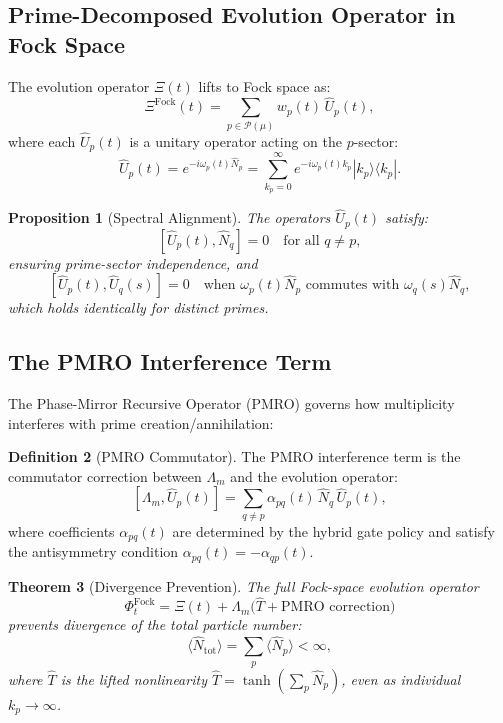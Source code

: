 \documentclass[11pt,a4paper]{article}
\theoremstyle{plain}
\newtheorem{theorem}{Theorem}[section]
\newtheorem{proposition}[theorem]{Proposition}
\theoremstyle{definition}
\newtheorem{definition}[theorem]{Definition}
\theoremstyle{remark}
\begin{document}
\subsection{Prime-Decomposed Evolution Operator in Fock Space}

The evolution operator \(\Xi(t)\) lifts to Fock space as:
\[
\Xi^{\text{Fock}}(t) = \sum_{p \in \mathcal{P}(\mu)} w_p(t) \, \hat{U}_p(t),
\]
where each \(\hat{U}_p(t)\) is a unitary operator acting on the \(p\)-sector:
\[
\hat{U}_p(t) = e^{-i \omega_p(t) \hat{N}_p} = \sum_{k_p=0}^\infty e^{-i \omega_p(t) k_p} |k_p\rangle\langle k_p|.
\]

\begin{proposition}[Spectral Alignment]\label{prop:spectral}
The operators \(\hat{U}_p(t)\) satisfy:
\[
[\hat{U}_p(t), \hat{N}_q] = 0 \quad \text{for all } q \neq p,
\]
ensuring prime-sector independence, and
\[
[\hat{U}_p(t), \hat{U}_q(s)] = 0 \quad \text{when } \omega_p(t) \hat{N}_p \text{ commutes with } \omega_q(s) \hat{N}_q,
\]
which holds identically for distinct primes.
\end{proposition}

\subsection{The PMRO Interference Term}

The Phase-Mirror Recursive Operator (PMRO) governs how multiplicity interferes with prime creation/annihilation:

\begin{definition}[PMRO Commutator]
The PMRO interference term is the commutator correction between \(\Lambda_m\) and the evolution operator:
\[
[\Lambda_m, \hat{U}_p(t)] = \sum_{q \neq p} \alpha_{pq}(t) \, \hat{N}_q \, \hat{U}_p(t),
\]
where coefficients \(\alpha_{pq}(t)\) are determined by the hybrid gate policy and satisfy the antisymmetry condition \(\alpha_{pq}(t) = -\alpha_{qp}(t)\).
\end{definition}

\begin{theorem}[Divergence Prevention]\label{thm:divergence}
The full Fock-space evolution operator
\[
\Phi_t^{\text{Fock}} = \Xi(t) + \Lambda_m \bigl( \hat{T} + \text{PMRO correction} \bigr)
\]
prevents divergence of the total particle number:
\[
\langle \hat{N}_{\text{tot}} \rangle = \sum_p \langle \hat{N}_p \rangle < \infty,
\]
where \(\hat{T}\) is the lifted nonlinearity \(\hat{T} = \tanh(\sum_p \hat{N}_p)\), even as individual \(k_p \to \infty\).
\end{theorem}
\end{document}
